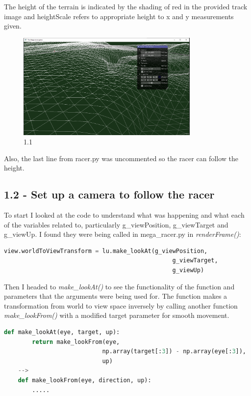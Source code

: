 \documentclass[a4 paper, 12pt]{article}
\begin{document}
The height of the terrain is indicated by the shading of red in the provided track image and heightScale refers to appropriate height to x and y measurements given. 
    \begin{figure} [H]
        \centering
        \includegraphics[width=0.8\textwidth, frame]
            {./images/1.1.PNG}
        \caption{1.1}
    \end{figure}  

    Also, the last line from racer.py was uncommented so the racer can follow the height.

\subsection{1.2 - Set up a camera to follow the racer}
To start I looked at the code to understand what was happening and what each of the variables related to, particularly g\_viewPosition, g\_viewTarget and g\_viewUp. I found they were being called in mega\_racer.py in \textit{renderFrame()}:
    \begin{lstlisting}[language=python]
    view.worldToViewTransform = lu.make_lookAt(g_viewPosition, 
                                                g_viewTarget, 
                                                g_viewUp)
    \end{lstlisting}

Then I headed to \textit{make\_lookAt()} to see the functionality of the function and parameters that the arguments were being used for. The function makes a transformation from world to view space inversely by calling another function \textit{make\_lookFrom()} with a modified target parameter for smooth movement.  
    \begin{lstlisting}[language=python]
    def make_lookAt(eye, target, up):
        return make_lookFrom(eye, 
                            np.array(target[:3]) - np.array(eye[:3]), 
                            up)
    --> 
    def make_lookFrom(eye, direction, up):
        .....
    \end{lstlisting}
\end{document}
